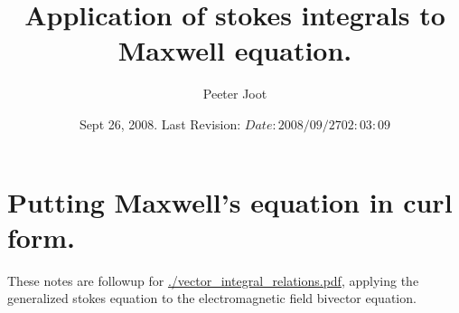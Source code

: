 \documentclass{article}
\title{ Application of stokes integrals to Maxwell equation. }
\author{Peeter Joot}
\date{ Sept 26, 2008.  Last Revision: $Date: 2008/09/27 02:03:09 $ }
\begin{document}

\maketitle{}

\tableofcontents

\section{ Putting Maxwell's equation in curl form. }

These notes are followup for 
\href{http://www.geocities.com/peeter_joot/geometric_algebra/vector_integral_relations.pdf}{./vector_integral_relations.pdf}, applying the generalized
stokes equation to the electromagnetic field bivector equation.
\end{document}
